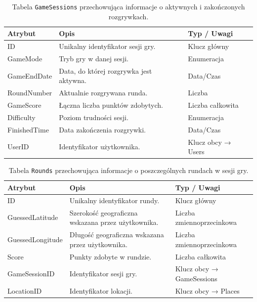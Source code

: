 \begin{table}[H]
  \centering
  \caption{Tabela \texttt{GameSessions} przechowująca informacje o aktywnych i zakończonych rozgrywkach.}
  \renewcommand{\arraystretch}{1.2}
  \begin{tabular}{|p{2.5cm}|p{7cm}|p{3cm}|}
    \hline
    \textbf{Atrybut} & \textbf{Opis}                           & \textbf{Typ / Uwagi} \\ \hline
    ID               & Unikalny identyfikator sesji gry.       & Klucz główny         \\ \hline
    GameMode         & Tryb gry w danej sesji.                 & Enumeracja           \\ \hline
    GameEndDate      & Data, do której rozgrywka jest aktywna. & Data/Czas            \\ \hline
    RoundNumber      & Aktualnie rozgrywana runda.             & Liczba               \\ \hline
    GameScore        & Łączna liczba punktów zdobytych.        & Liczba całkowita     \\ \hline
    Difficulty       & Poziom trudności sesji.                 & Enumeracja           \\ \hline
    FinishedTime     & Data zakończenia rozgrywki.             & Data/Czas            \\ \hline
    UserID           & Identyfikator użytkownika.              & Klucz obcy → Users   \\ \hline
  \end{tabular}
  \label{tab:game-sessions}
\end{table}

\begin{table}[H]
  \centering
  \caption{Tabela \texttt{Rounds} przechowująca informacje o poszczególnych rundach w sesji gry.}
  \renewcommand{\arraystretch}{1.2}
  \begin{tabular}{|p{2.5cm}|p{5cm}|p{5cm}|}
    \hline
    \textbf{Atrybut} & \textbf{Opis}                                      & \textbf{Typ / Uwagi}      \\ \hline
    ID               & Unikalny identyfikator rundy.                      & Klucz główny              \\ \hline
    GuessedLatitude  & Szerokość geograficzna wskazana przez użytkownika. & Liczba zmiennoprzecinkowa \\ \hline
    GuessedLongitude & Długość geograficzna wskazana przez użytkownika.   & Liczba zmiennoprzecinkowa \\ \hline
    Score            & Punkty zdobyte w rundzie.                          & Liczba całkowita          \\ \hline
    GameSessionID    & Identyfikator sesji gry.                           & Klucz obcy → GameSessions \\ \hline
    LocationID       & Identyfikator lokacji.                             & Klucz obcy → Places       \\ \hline
  \end{tabular}
  \label{tab:rounds}
\end{table}

